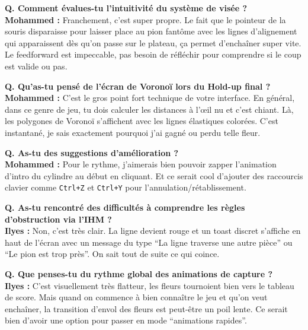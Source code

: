 \documentclass[11pt,a4paper]{article}
\begin{document}
\begin{tcolorbox}[gamerbox, title={Mohammed -- 21 ans, joueur d'esport compétitif}]
    \textbf{Q. Comment évalues-tu l'intuitivité du système de visée ?}\\
    \textbf{Mohammed :} Franchement, c'est super propre. Le fait que le pointeur de la souris disparaisse pour laisser place au pion fantôme avec les lignes d'alignement qui apparaissent dès qu'on passe sur le plateau, ça permet d'enchaîner super vite. Le feedforward est impeccable, pas besoin de réfléchir pour comprendre si le coup est valide ou pas.

    \textbf{Q. Qu'as-tu pensé de l'écran de Voronoï lors du Hold-up final ?}\\
    \textbf{Mohammed :} C'est le gros point fort technique de votre interface. En général, dans ce genre de jeu, tu dois calculer les distances à l'œil nu et c'est chiant. Là, les polygones de Voronoï s'affichent avec les lignes élastiques colorées. C'est instantané, je sais exactement pourquoi j'ai gagné ou perdu telle fleur.

    \textbf{Q. As-tu des suggestions d'amélioration ?}\\
    \textbf{Mohammed :} Pour le rythme, j'aimerais bien pouvoir zapper l'animation d'intro du cylindre au début en cliquant. Et ce serait cool d'ajouter des raccourcis clavier comme \texttt{Ctrl+Z} et \texttt{Ctrl+Y} pour l'annulation/rétablissement.
\end{tcolorbox}

\begin{tcolorbox}[gamerbox, title={Ilyes -- 22 ans, amateur de jeux de stratégie}]
    \textbf{Q. As-tu rencontré des difficultés à comprendre les règles d'obstruction via l'IHM ?}\\
    \textbf{Ilyes :} Non, c'est très clair. La ligne devient rouge et un toast discret s'affiche en haut de l'écran avec un message du type ``La ligne traverse une autre pièce'' ou ``Le pion est trop près''. On sait tout de suite ce qui coince.

    \textbf{Q. Que penses-tu du rythme global des animations de capture ?}\\
    \textbf{Ilyes :} C'est visuellement très flatteur, les fleurs tournoient bien vers le tableau de score. Mais quand on commence à bien connaître le jeu et qu'on veut enchaîner, la transition d'envol des fleurs est peut-être un poil lente. Ce serait bien d'avoir une option pour passer en mode ``animations rapides''.
\end{tcolorbox}
\end{document}
